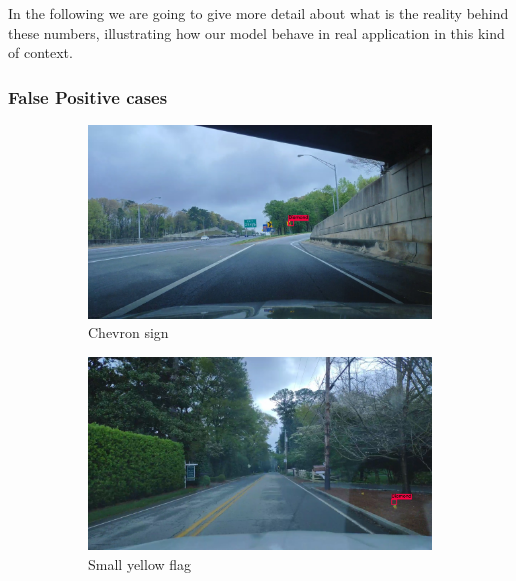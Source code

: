 In the following we are going to give more detail about what is the reality behind these numbers, illustrating how our model behave in real application in this kind of context.

\subsubsection{False Positive cases}
\begin{figure}
  \begin{center}
    \begin{subfigure}[t]{.49\linewidth}
      \centering
      \includegraphics[width=0.99\linewidth]{figures/examples/westwestley/FP/FP01.jpg}
      \caption{Chevron sign}
      \label{fig:wwChevronFP}
    \end{subfigure}
    \begin{subfigure}[t]{.49\linewidth}
      \centering
      \includegraphics[width=0.99\linewidth]{figures/examples/westwestley/FP/FP02.jpg}
      \caption{Small yellow flag}
      \label{fig:wwFlag1FP}
    \end{subfigure}
    \begin{subfigure}[t]{.49\linewidth}

\end{subfigure}
\end{center}
\end{figure}
